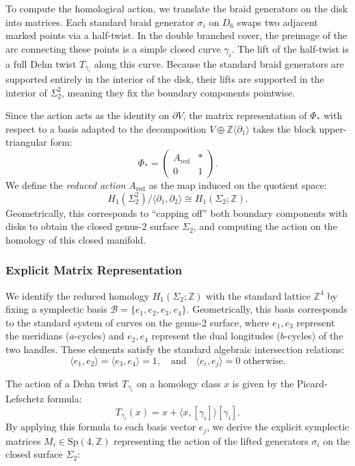 To compute the homological action, we translate the braid generators on the disk into matrices. Each standard braid generator $\sigma_i$ on $D_6$ swaps two adjacent marked points via a half-twist. In the double branched cover, the preimage of the arc connecting these points is a simple closed curve $\gamma_i$. The lift of the half-twist is a full Dehn twist $T_{\gamma_i}$ along this curve. Because the standard braid generators are supported entirely in the interior of the disk, their lifts are supported in the interior of $\Sigma_2^2$, meaning they fix the boundary components pointwise.

Since the action acts as the identity on $\partial V$, the matrix representation of $\Phi_*$ with respect to a basis adapted to the decomposition $V \oplus \mathbb{Z}\langle \partial_1 \rangle$ takes the block upper-triangular form:
\[
\Phi_* = \begin{pmatrix}
A_{\text{red}} & * \\
0 & 1
\end{pmatrix}.
\]
We define the \emph{reduced action} $A_{\text{red}}$ as the map induced on the quotient space:
\[
H_1(\Sigma_2^2) / \langle \partial_1, \partial_2 \rangle \cong H_1(\Sigma_2; \mathbb{Z}).
\]
Geometrically, this corresponds to ``capping off'' both boundary components with disks to obtain the closed genus-2 surface $\Sigma_2$, and computing the action on the homology of this closed manifold.

\subsubsection{Explicit Matrix Representation}

We identify the reduced homology $H_1(\Sigma_2; \mathbb{Z})$ with the standard lattice $\mathbb{Z}^4$ by fixing a symplectic basis $\mathcal{B} = \{e_1, e_2, e_3, e_4\}$. Geometrically, this basis corresponds to the standard system of curves on the genus-2 surface, where $e_1, e_3$ represent the meridians ($a$-cycles) and $e_2, e_4$ represent the dual longitudes ($b$-cycles) of the two handles. These elements satisfy the standard algebraic intersection relations:
\[
\langle e_1, e_2 \rangle = \langle e_3, e_4 \rangle = 1, \quad \text{and} \quad \langle e_i, e_j \rangle = 0 \text{ otherwise.}
\]

The action of a Dehn twist $T_{\gamma_i}$ on a homology class $x$ is given by the Picard-Lefschetz formula:
\begin{equation}
    T_{\gamma_i}(x) = x + \langle x, [\gamma_i] \rangle [\gamma_i].
\end{equation}
By applying this formula to each basis vector $e_j$, we derive the explicit symplectic matrices $M_i \in \text{Sp}(4, \mathbb{Z})$ representing the action of the lifted generators $\sigma_i$ on the closed surface $\Sigma_2$:

